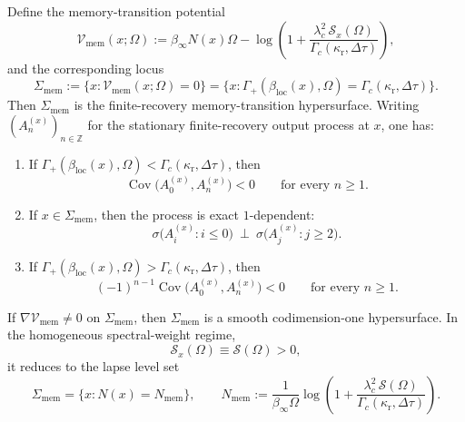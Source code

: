 \begin{theorem}
Define the memory-transition potential
\begin{equation}\label{eq:memory-potential}
\mathcal V_{\mathrm{mem}}(x;\Omega)
:=
\beta_\infty N(x)\Omega
-
\log\!\left(
1+\frac{\lambda_c^2\,\mathcal S_x(\Omega)}{\Gamma_c(\kappa_{\mathrm r},\Delta\tau)}
\right),
\end{equation}
and the corresponding locus
\begin{equation}\label{eq:memory-surface}
\Sigma_{\mathrm{mem}}
:=
\{x:\mathcal V_{\mathrm{mem}}(x;\Omega)=0\}
=
\{x:\Gamma_+(\beta_{\mathrm{loc}}(x),\Omega)=\Gamma_c(\kappa_{\mathrm r},\Delta\tau)\}.
\end{equation}
Then $\Sigma_{\mathrm{mem}}$ is the finite-recovery memory-transition hypersurface. Writing $(A_n^{(x)})_{n\in\mathbb Z}$ for the stationary finite-recovery output process at $x$, one has:
\begin{enumerate}[label=\textup{(\roman*)},leftmargin=*,itemsep=4pt]
\item If $\Gamma_+(\beta_{\mathrm{loc}}(x),\Omega)<\Gamma_c(\kappa_{\mathrm r},\Delta\tau)$, then
\[
\operatorname{Cov}\!\bigl(A_0^{(x)},A_n^{(x)}\bigr)<0
\qquad
\text{for every }n\ge 1.
\]
\item If $x\in\Sigma_{\mathrm{mem}}$, then the process is exact $1$-dependent:
\[
\sigma\!\bigl(A_i^{(x)}:i\le 0\bigr)\ \perp\ \sigma\!\bigl(A_j^{(x)}:j\ge 2\bigr).
\]
\item If $\Gamma_+(\beta_{\mathrm{loc}}(x),\Omega)>\Gamma_c(\kappa_{\mathrm r},\Delta\tau)$, then
\[
(-1)^{n-1}\operatorname{Cov}\!\bigl(A_0^{(x)},A_n^{(x)}\bigr)<0
\qquad
\text{for every }n\ge 1.
\]
\end{enumerate}
If $\nabla\mathcal V_{\mathrm{mem}}\neq 0$ on $\Sigma_{\mathrm{mem}}$, then $\Sigma_{\mathrm{mem}}$ is a smooth codimension-one hypersurface. In the homogeneous spectral-weight regime,
\[
\mathcal S_x(\Omega)\equiv \mathcal S(\Omega)>0,
\]
it reduces to the lapse level set
\begin{equation}\label{eq:memory-lapse-level}
\Sigma_{\mathrm{mem}}
=
\{x:N(x)=N_{\mathrm{mem}}\},
\qquad
N_{\mathrm{mem}}
:=
\frac{1}{\beta_\infty\Omega}
\log\!\left(
1+\frac{\lambda_c^2\,\mathcal S(\Omega)}{\Gamma_c(\kappa_{\mathrm r},\Delta\tau)}
\right).
\end{equation}
\end{theorem}

